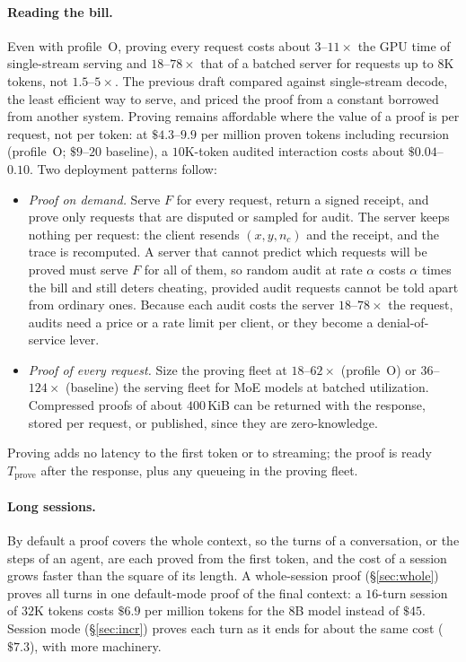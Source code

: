\documentclass[11pt]{article}
\begin{document}
\paragraph{Reading the bill.}
Even with profile~O, proving every request costs about \(3\)--\(11\times\) the GPU time of single-stream serving and \(18\)--\(78\times\) that of a batched server for requests up to \(8\)K tokens, not \(1.5\)--\(5\times\).
The previous draft compared against single-stream decode, the least efficient way to serve, and priced the proof from a constant borrowed from another system.
Proving remains affordable where the value of a proof is per request, not per token: at \(\$4.3\)--\(9.9\) per million proven tokens including recursion (profile~O; \(\$9\)--\(20\) baseline), a \(10\)K-token audited interaction costs about \(\$0.04\)--\(0.10\).
Two deployment patterns follow:
\begin{itemize}
\item \emph{Proof on demand.} Serve \(F\) for every request, return a signed receipt, and prove only requests that are disputed or sampled for audit. The server keeps nothing per request: the client resends \((x, y, n_c)\) and the receipt, and the trace is recomputed. A server that cannot predict which requests will be proved must serve \(F\) for all of them, so random audit at rate \(\alpha\) costs \(\alpha\) times the bill and still deters cheating, provided audit requests cannot be told apart from ordinary ones. Because each audit costs the server \(18\)--\(78\times\) the request, audits need a price or a rate limit per client, or they become a denial-of-service lever.
\item \emph{Proof of every request.} Size the proving fleet at \(18\)--\(62\times\) (profile~O) or \(36\)--\(124\times\) (baseline) the serving fleet for MoE models at batched utilization. Compressed proofs of about \(400\)\,KiB can be returned with the response, stored per request, or published, since they are zero-knowledge.
\end{itemize}
Proving adds no latency to the first token or to streaming; the proof is ready \(T_{\mathrm{prove}}\) after the response, plus any queueing in the proving fleet.

\paragraph{Long sessions.}
By default a proof covers the whole context, so the turns of a conversation, or the steps of an agent, are each proved from the first token, and the cost of a session grows faster than the square of its length.
A whole-session proof (\S\ref{sec:whole}) proves all turns in one default-mode proof of the final context: a \(16\)-turn session of \(32\)K tokens costs \(\$6.9\) per million tokens for the 8B model instead of \(\$45\). Session mode (\S\ref{sec:incr}) proves each turn as it ends for about the same cost (\(\$7.3\)), with more machinery.
\end{document}
